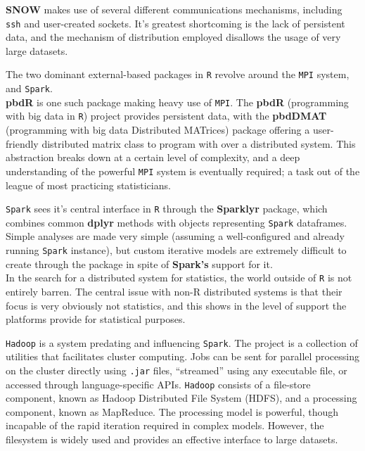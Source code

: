 

\textbf{SNOW} makes use of several different communications mechanisms, including \texttt{ssh} and user-created sockets.
It's greatest shortcoming is the lack of persistent data, and the mechanism of distribution employed disallows the usage of very large datasets.

The two dominant external-based packages in \texttt{R} revolve around the \texttt{MPI} system, and \texttt{Spark}.\\

\textbf{pbdR} is one such package making heavy use of \texttt{MPI}\cite{pbdR2012}.
The \textbf{pbdR} (programming with big data in \texttt{R}) project provides persistent data, with the \textbf{pbdDMAT} (programming with big data Distributed MATrices) package offering a user-friendly distributed matrix class to program with over a distributed system\cite{pbdDMATpackage}.
This abstraction breaks down at a certain level of complexity, and a deep understanding of the powerful \texttt{MPI} system is eventually required; a task out of the league of most practicing statisticians.

\texttt{Spark} sees it's central interface in \texttt{R} through the \textbf{Sparklyr} package, which combines common \textbf{dplyr} methods with objects representing \texttt{Spark} dataframes\cite{luraschi20}.
Simple analyses are made very simple (assuming a well-configured and already running \texttt{Spark} instance), but custom iterative models are extremely difficult to create through the package in spite of \textbf{Spark's} support for it.\\

In the search for a distributed system for statistics, the world outside of \texttt{R} is not entirely barren.
The central issue with non-R distributed systems is that their focus is very obviously not statistics, and this shows in the level of support the platforms provide for statistical purposes.

\texttt{Hadoop} is a system predating and influencing \texttt{Spark}\cite{shvachko2010hadoop}.
The project is a collection of utilities that facilitates cluster computing.
Jobs can be sent for parallel processing on the cluster directly using \texttt{.jar} files, ``streamed'' using any executable file, or accessed through language-specific APIs.
\texttt{Hadoop} consists of a file-store component, known as Hadoop Distributed File System (HDFS), and a processing component, known as MapReduce.
The processing model is powerful, though incapable of the rapid iteration required in complex models\cite{zaharia2010spark}.
However, the filesystem is widely used and provides an effective interface to large datasets.

